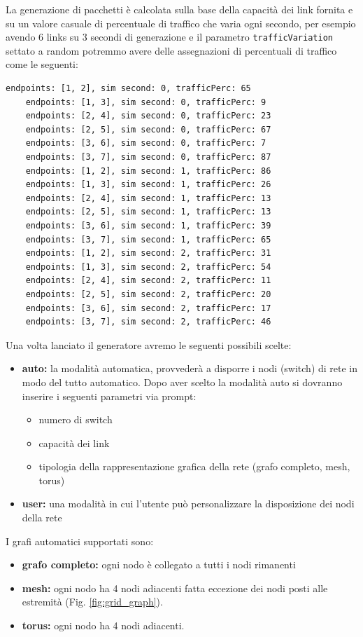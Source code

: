 \documentclass[binding=0.6cm]{sapthesis}
\begin{document}
La generazione di pacchetti è calcolata sulla base 
della capacità dei link fornita e su un valore casuale di percentuale di traffico 
che varia ogni secondo, per esempio avendo 6 links su 3 secondi di generazione e il 
parametro \texttt{trafficVariation} settato a random potremmo avere delle assegnazioni di 
percentuali di traffico come le seguenti:
{\scriptsize %
\begin{lstlisting}[caption={Esempio di variazione traffico casuale}]
    endpoints: [1, 2], sim second: 0, trafficPerc: 65
    endpoints: [1, 3], sim second: 0, trafficPerc: 9
    endpoints: [2, 4], sim second: 0, trafficPerc: 23
    endpoints: [2, 5], sim second: 0, trafficPerc: 67
    endpoints: [3, 6], sim second: 0, trafficPerc: 7
    endpoints: [3, 7], sim second: 0, trafficPerc: 87
    endpoints: [1, 2], sim second: 1, trafficPerc: 86
    endpoints: [1, 3], sim second: 1, trafficPerc: 26
    endpoints: [2, 4], sim second: 1, trafficPerc: 13
    endpoints: [2, 5], sim second: 1, trafficPerc: 13
    endpoints: [3, 6], sim second: 1, trafficPerc: 39
    endpoints: [3, 7], sim second: 1, trafficPerc: 65
    endpoints: [1, 2], sim second: 2, trafficPerc: 31
    endpoints: [1, 3], sim second: 2, trafficPerc: 54
    endpoints: [2, 4], sim second: 2, trafficPerc: 11
    endpoints: [2, 5], sim second: 2, trafficPerc: 20
    endpoints: [3, 6], sim second: 2, trafficPerc: 17
    endpoints: [3, 7], sim second: 2, trafficPerc: 46
\end{lstlisting}
}
Una volta lanciato il generatore avremo le seguenti possibili scelte:

\begin{itemize}
    \item \textbf{auto:} la modalità automatica, provvederà a disporre i nodi (switch) di rete in modo del
    tutto automatico. Dopo aver scelto la modalità auto si dovranno inserire i seguenti parametri via prompt:
    \begin{itemize}
        \item numero di switch
        \item capacità dei link
        \item tipologia della rappresentazione grafica della rete (grafo completo, mesh, torus)
    \end{itemize}
    \item \textbf{user:} una modalità in cui l'utente può personalizzare la disposizione dei nodi della rete
\end{itemize}
I grafi automatici supportati sono:
\begin{itemize}
    \item \textbf{grafo completo:} ogni nodo è collegato a tutti i nodi rimanenti \cite{WikiGrafoCompleto}
    \item \textbf{mesh:} ogni nodo ha 4 nodi adiacenti fatta eccezione dei nodi posti alle estremità (Fig. \ref{fig:grid_graph}).
    \item \textbf{torus:} ogni nodo ha 4 nodi adiacenti.
\end{itemize}
\end{document}
